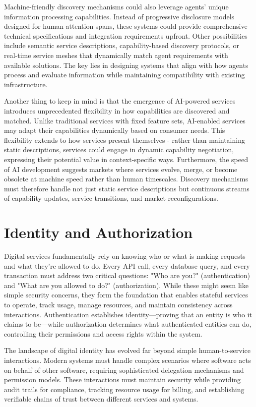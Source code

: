 \documentclass{article}
\begin{document}
Machine-friendly discovery mechanisms could also leverage agents' unique information processing capabilities. Instead of progressive disclosure models designed for human attention spans, these systems could provide comprehensive technical specifications and integration requirements upfront. Other possibilities include semantic service descriptions, capability-based discovery protocols, or real-time service meshes that dynamically match agent requirements with available solutions. The key lies in designing systems that align with how agents process and evaluate information while maintaining compatibility with existing infrastructure.

Another thing to keep in mind is that the emergence of AI-powered services introduces unprecedented flexibility in how capabilities are discovered and matched. Unlike traditional services with fixed feature sets, AI-enabled services may adapt their capabilities dynamically based on consumer needs. This flexibility extends to how services present themselves - rather than maintaining static descriptions, services could engage in dynamic capability negotiation, expressing their potential value in context-specific ways. Furthermore, the speed of AI development suggests markets where services evolve, merge, or become obsolete at machine speed rather than human timescales. Discovery mechanisms must therefore handle not just static service descriptions but continuous streams of capability updates, service transitions, and market reconfigurations.

\section{Identity and Authorization}
Digital services fundamentally rely on knowing who or what is making requests and what they're allowed to do. Every API call, every database query, and every transaction must address two critical questions: "Who are you?" (authentication) and "What are you allowed to do?" (authorization). While these might seem like simple security concerns, they form the foundation that enables stateful services to operate, track usage, manage resources, and maintain consistency across interactions. Authentication establishes identity—proving that an entity is who it claims to be—while authorization determines what authenticated entities can do, controlling their permissions and access rights within the system.

The landscape of digital identity has evolved far beyond simple human-to-service interactions. Modern systems must handle complex scenarios where software acts on behalf of other software, requiring sophisticated delegation mechanisms and permission models. These interactions must maintain security while providing audit trails for compliance, tracking resource usage for billing, and establishing verifiable chains of trust between different services and systems.
\end{document}
